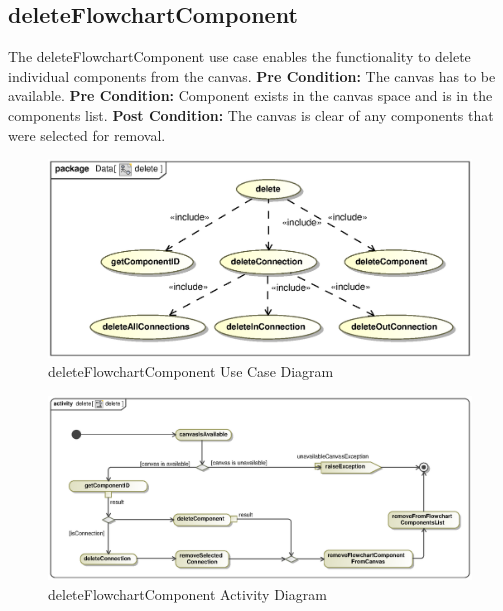 \documentclass[11pt,a4paper,titlepage]{article}
\begin{document}
\newpage
\subsection{deleteFlowchartComponent}
The deleteFlowchartComponent use case enables the functionality to delete individual components from the canvas.\newline\newline
\textbf{Pre Condition:} The canvas has to be available. \newline
\textbf{Pre Condition:} Component exists in the canvas space and is in the components list.\newline\newline
\textbf{Post Condition:} The canvas is clear of any components that were selected for removal.

\begin{figure}[H]
  \centering
\includegraphics[width=500px]{delete.eps}
\caption{deleteFlowchartComponent Use Case Diagram}
\end{figure}

\begin{figure}[H]
  \centering
\includegraphics[width=500px]{deleteAct.eps}
\caption{deleteFlowchartComponent Activity Diagram}
\end{figure}

\newpage
\end{document}
